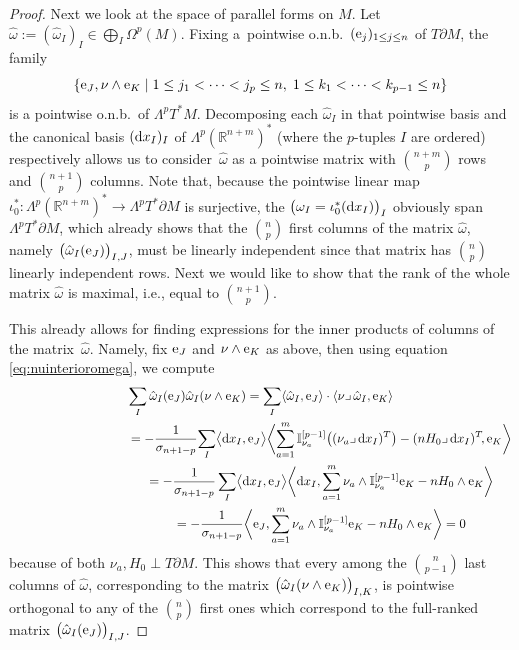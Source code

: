 \documentclass[pdftex]{sigma}
\numberwithin{equation}{section}
\begin{document}
\begin{proof}
Next we look at the space of parallel forms on $M$. Let $\hat{\omega}:=\left(\hat{\omega}_I\right)_I\in\bigoplus_I\Omega^p(M)$. Fixing a~pointwise o.n.b.\ $({\rm e}_j)_{1\leq j\leq n}$ of $T\partial M$, the family
\[\left\{{\rm e}_J,\nu\wedge {\rm e}_K \mid 1\leq j_1<\dots< j_p\leq n,\;1\leq k_1<\dots<k_{p-1}\leq n \right\}\]
is a pointwise o.n.b.\ of $\Lambda^pT^*M$. Decomposing each $\hat{\omega}_I$ in that pointwise basis and the canonical basis $({\rm d}x_I)_I$ of $\Lambda^p(\mathbb{R}^{n+m})^*$ (where the $p$-tuples $I$ are ordered) respectively allows us to consider~$\hat{\omega}$ as a pointwise matrix with $\binom{n+m}{p}$ rows and $\binom{n+1}{p}$ columns.
Note that, because the pointwise linear map $\iota_0^*\colon\Lambda^p(\mathbb{R}^{n+m})^*\to\Lambda^pT^*\partial M$ is  surjective, the $\bigl(\omega_I=\iota_0^*({\rm d}x_I)\bigr)_I$ obviously span $\Lambda^pT^*\partial M$, which already shows that the $\binom{n}{p}$ first columns of the matrix $\hat{\omega}$, namely $\bigl(\hat{\omega}_I({\rm e}_J)\bigr)_{I,J}$, must be linearly independent since that matrix has $\binom{n}{p}$ linearly independent rows. Next we would like to show that the rank of the whole matrix $\hat{\omega}$ is maximal, i.e., equal to $\binom{n+1}{p}$.

This already allows for finding expressions for the inner products of columns of the matrix~$\hat{\omega}$.
Namely, fix ${\rm e}_J$ and $\nu\wedge {\rm e}_K$ as above, then using equation \eqref{eq:nuinterioromega}, we compute
\begin{gather*}
\sum_I\hat{\omega}_I({\rm e}_J)\hat{\omega}_I(\nu\wedge {\rm e}_K)=\sum_I\langle\hat{\omega}_I,{\rm e}_J\rangle\cdot\langle\nu\lrcorner\,\hat{\omega}_I,{\rm e}_K\rangle\\
\hphantom{\sum_I\hat{\omega}_I({\rm e}_J)\hat{\omega}_I(\nu\wedge {\rm e}_K)}=-\frac{1}{\sigma_{n+1-p}}\!\sum_I\bigl\langle{\rm d}x_I,{\rm e}_J\bigr\rangle\biggl\langle\sum_{a=1}^m\mathbb{I}_{\nu_a}^{[p-1]}\bigl((\nu_a\lrcorner\,{\rm d}x_I)^T\bigr)-(nH_0\lrcorner\,{\rm d}x_I)^T\!, {\rm e}_K\biggr\rangle\\
\hphantom{\sum_I\hat{\omega}_I({\rm e}_J)\hat{\omega}_I(\nu\wedge {\rm e}_K)}=-\frac{1}{\sigma_{n+1-p}}\sum_I \bigl\langle {\rm d}x_I,{\rm e}_J\bigr\rangle\biggl\langle {\rm d}x_I,\sum_{a=1}^m\nu_a\wedge\mathbb{I}_{\nu_a}^{[p-1]}{\rm e}_K-nH_0\wedge {\rm e}_K\biggr\rangle\\
\hphantom{\sum_I\hat{\omega}_I({\rm e}_J)\hat{\omega}_I(\nu\wedge {\rm e}_K)}=-\frac{1}{\sigma_{n+1-p}}\biggl\langle {\rm e}_J,\sum_{a=1}^m \nu_a\wedge\mathbb{I}_{\nu_a}^{[p-1]}{\rm e}_K-nH_0\wedge {\rm e}_K \biggr\rangle
=0
\end{gather*}
because of both $\nu_a,H_0\perp T\partial M$. This shows that every among the $\binom{n}{p-1}$ last columns of $\hat{\omega}$, corresponding to the matrix $\bigl(\hat{\omega}_I(\nu\wedge {\rm e}_K)\bigr)_{I,K}$, is pointwise orthogonal to any of the $\binom{n}{p}$ first ones which correspond to the full-ranked matrix $\bigl(\hat{\omega}_I({\rm e}_J)\bigr)_{I,J}$.


\end{proof}
\end{document}

